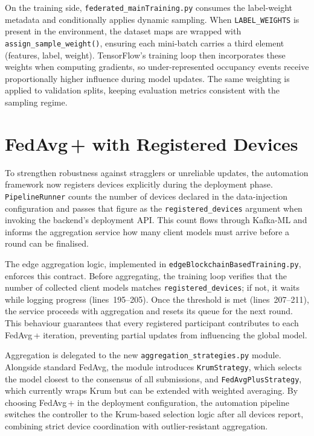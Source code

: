 On the training side, \texttt{federated\_mainTraining.py} consumes the label-weight metadata and conditionally applies dynamic sampling. When \texttt{LABEL\_WEIGHTS} is present in the environment, the dataset maps are wrapped with \texttt{assign\_sample\_weight()}, ensuring each mini-batch carries a third element (features, label, weight). TensorFlow’s training loop then incorporates these weights when computing gradients, so under-represented occupancy events receive proportionally higher influence during model updates. The same weighting is applied to validation splits, keeping evaluation metrics consistent with the sampling regime.

\section{FedAvg\,+ with Registered Devices}
\label{sec:fedavg_plus}

To strengthen robustness against stragglers or unreliable updates, the automation framework now registers devices explicitly during the deployment phase. \texttt{PipelineRunner} counts the number of devices declared in the data-injection configuration and passes that figure as the \texttt{registered\_devices} argument when invoking the backend’s deployment API. This count flows through Kafka-ML and informs the aggregation service how many client models must arrive before a round can be finalised.

The edge aggregation logic, implemented in \texttt{edgeBlockchainBasedTraining.py}, enforces this contract. Before aggregating, the training loop verifies that the number of collected client models matches \texttt{registered\_devices}; if not, it waits while logging progress (lines~195--205). Once the threshold is met (lines~207--211), the service proceeds with aggregation and resets its queue for the next round. This behaviour guarantees that every registered participant contributes to each FedAvg\,+ iteration, preventing partial updates from influencing the global model.

Aggregation is delegated to the new \texttt{aggregation\_strategies.py} module. Alongside standard FedAvg, the module introduces \texttt{KrumStrategy}, which selects the model closest to the consensus of all submissions, and \texttt{FedAvgPlusStrategy}, which currently wraps Krum but can be extended with weighted averaging. By choosing FedAvg\,+ in the deployment configuration, the automation pipeline switches the controller to the Krum-based selection logic after all devices report, combining strict device coordination with outlier-resistant aggregation.

